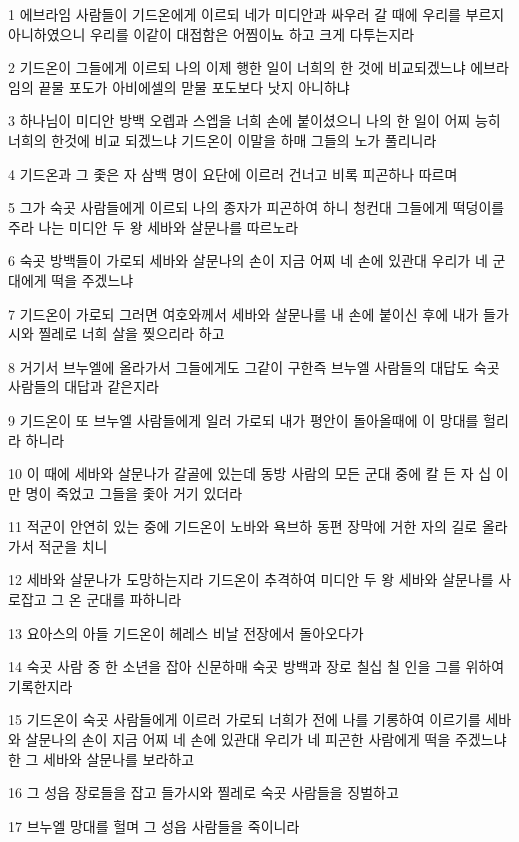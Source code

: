 \par 1 에브라임 사람들이 기드온에게 이르되 네가 미디안과 싸우러 갈 때에 우리를 부르지 아니하였으니 우리를 이같이 대접함은 어찜이뇨 하고 크게 다투는지라
\par 2 기드온이 그들에게 이르되 나의 이제 행한 일이 너희의 한 것에 비교되겠느냐 에브라임의 끝물 포도가 아비에셀의 맏물 포도보다 낫지 아니하냐
\par 3 하나님이 미디안 방백 오렙과 스엡을 너희 손에 붙이셨으니 나의 한 일이 어찌 능히 너희의 한것에 비교 되겠느냐 기드온이 이말을 하매 그들의 노가 풀리니라
\par 4 기드온과 그 좇은 자 삼백 명이 요단에 이르러 건너고 비록 피곤하나 따르며
\par 5 그가 숙곳 사람들에게 이르되 나의 종자가 피곤하여 하니 청컨대 그들에게 떡덩이를 주라 나는 미디안 두 왕 세바와 살문나를 따르노라
\par 6 숙곳 방백들이 가로되 세바와 살문나의 손이 지금 어찌 네 손에 있관대 우리가 네 군대에게 떡을 주겠느냐
\par 7 기드온이 가로되 그러면 여호와께서 세바와 살문나를 내 손에 붙이신 후에 내가 들가시와 찔레로 너희 살을 찢으리라 하고
\par 8 거기서 브누엘에 올라가서 그들에게도 그같이 구한즉 브누엘 사람들의 대답도 숙곳 사람들의 대답과 같은지라
\par 9 기드온이 또 브누엘 사람들에게 일러 가로되 내가 평안이 돌아올때에 이 망대를 헐리라 하니라
\par 10 이 때에 세바와 살문나가 갈골에 있는데 동방 사람의 모든 군대 중에 칼 든 자 십 이만 명이 죽었고 그들을 좇아 거기 있더라
\par 11 적군이 안연히 있는 중에 기드온이 노바와 욕브하 동편 장막에 거한 자의 길로 올라가서 적군을 치니
\par 12 세바와 살문나가 도망하는지라 기드온이 추격하여 미디안 두 왕 세바와 살문나를 사로잡고 그 온 군대를 파하니라
\par 13 요아스의 아들 기드온이 헤레스 비날 전장에서 돌아오다가
\par 14 숙곳 사람 중 한 소년을 잡아 신문하매 숙곳 방백과 장로 칠십 칠 인을 그를 위하여 기록한지라
\par 15 기드온이 숙곳 사람들에게 이르러 가로되 너희가 전에 나를 기롱하여 이르기를 세바와 살문나의 손이 지금 어찌 네 손에 있관대 우리가 네 피곤한 사람에게 떡을 주겠느냐 한 그 세바와 살문나를 보라하고
\par 16 그 성읍 장로들을 잡고 들가시와 찔레로 숙곳 사람들을 징벌하고
\par 17 브누엘 망대를 헐며 그 성읍 사람들을 죽이니라
